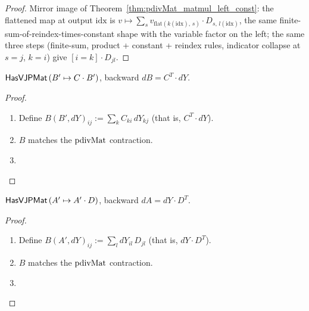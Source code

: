 \begin{proof}
\leanok
Mirror image of Theorem~\ref{thm:pdivMat_matmul_left_const}: the
flattened map at output \(\mathrm{idx}\) is
\(v \mapsto \sum_s v_{\mathrm{flat}(k(\mathrm{idx}),\, s)} \cdot
  D_{s,\, l(\mathrm{idx})}\), the same finite-sum-of-reindex-times-constant
shape with the variable factor on the left; the same three steps
(finite-sum, product + constant + reindex rules, indicator collapse
at \(s = j\), \(k = i\)) give \([i = k] \cdot D_{jl}\).
\end{proof}

\begin{theorem}
  \label{thm:matmulLeftConstHasVJP}
  \leanok
  \(\mathsf{HasVJPMat}\, (B' \mapsto C \cdot B')\), backward
  \(dB = C^{T} \cdot dY\).
\end{theorem}

\begin{proof}
\leanok
\begin{enumerate}
  \item Define \(B(B', dY)_{ij} := \sum_k C_{ki}\, dY_{kj}\)
    (that is, \(C^T \cdot dY\)).
  \item \Suffices{} \(B\) matches the \(\operatorname{pdivMat}\) contraction.
  \item \Qed{}
\end{enumerate}
\end{proof}

\begin{theorem}
  \label{thm:matmulRightConstHasVJP}
  \leanok
  \(\mathsf{HasVJPMat}\, (A' \mapsto A' \cdot D)\), backward
  \(dA = dY \cdot D^{T}\).
\end{theorem}

\begin{proof}
\leanok
\begin{enumerate}
  \item Define \(B(A', dY)_{ij} := \sum_l dY_{il}\, D_{jl}\)
    (that is, \(dY \cdot D^T\)).
  \item \Suffices{} \(B\) matches the \(\operatorname{pdivMat}\) contraction.
  \item \Qed{}
\end{enumerate}
\end{proof}

